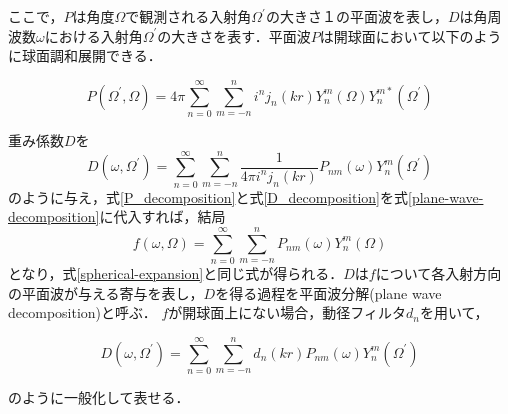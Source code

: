 \documentclass[a4paper,12pt]{jsarticle}
\begin{document}
ここで，$P$は角度$\Omega$で観測される入射角$\Omega^\prime$の大きさ１の平面波を表し，$D$は角周波数$\omega$における入射角$\Omega^\prime$の大きさを表す．平面波$P$は開球面において以下のように球面調和展開できる．

\begin{equation}
    \label{P_decomposition}
    P\left(\Omega^{\prime}, \Omega\right)=4 \pi \sum_{n=0}^{\infty} \sum_{m=-n}^{n} i^{n} j_{n}(k r) Y_{n}^{m}(\Omega) Y_{n}^{m *}\left(\Omega^{\prime}\right)
\end{equation}

重み係数$D$を
\begin{equation}
    \label{D_decomposition}
    D\left(\omega, \Omega^{\prime}\right)=\sum_{n=0}^{\infty} \sum_{m=-n}^{n} \frac{1}{4 \pi i^{n} j_{n}(k r)} P_{n m}(\omega) Y_{n}^{m}\left(\Omega^{\prime}\right)
\end{equation}
のように与え，式\ref{P_decomposition}と式\ref{D_decomposition}を式\ref{plane-wave-decomposition}に代入すれば，結局
$$
    f(\omega, \Omega)=\sum_{n=0}^{\infty} \sum_{m=-n}^{n} P_{n m}(\omega) Y_{n}^{m}(\Omega)
$$
となり，式\ref{spherical-expansion}と同じ式が得られる．$D$は$f$について各入射方向の平面波が与える寄与を表し，$D$を得る過程を平面波分解(plane wave decomposition)と呼ぶ．
$f$が開球面上にない場合，動径フィルタ$d_n$を用いて，

$$
    D\left(\omega, \Omega^{\prime}\right)=\sum_{n=0}^{\infty} \sum_{m=-n}^{n} d_{n}(k r) P_{n m}(\omega) Y_{n}^{m}\left(\Omega^{\prime}\right)
$$

のように一般化して表せる．




\end{document}
